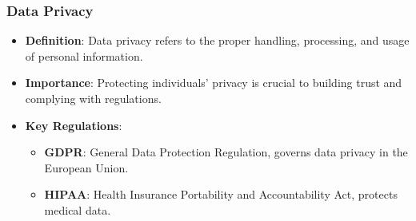 \documentclass[aspectratio=169]{beamer}
\begin{document}
\begin{frame}[fragile]
  \frametitle{Data Privacy}
  \begin{itemize}
    \item \textbf{Definition}: Data privacy refers to the proper handling, processing, and usage of personal information.
    \item \textbf{Importance}: Protecting individuals' privacy is crucial to building trust and complying with regulations.
    \item \textbf{Key Regulations}:
      \begin{itemize}
        \item \textbf{GDPR}: General Data Protection Regulation, governs data privacy in the European Union.
        \item \textbf{HIPAA}: Health Insurance Portability and Accountability Act, protects medical data.
      \end{itemize}
  \end{itemize}
\end{frame}
\end{document}
